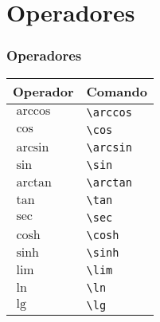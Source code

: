 \documentclass[brazilian]{beamer}
\begin{document}
\section{Operadores}
\begin{frame}[fragile]
    \frametitle{Operadores}

    \begin{table}
        \begin{tabular}{O{2cm}l}
            Operador & Comando \\ \hline
            \(\arccos \) & \lstinline[style=myStyleLatex]!\arccos ! \\ \hline
            \(\cos \) & \lstinline[style=myStyleLatex]!\cos ! \\ \hline
            \(\arcsin \) & \lstinline[style=myStyleLatex]!\arcsin ! \\ \hline
            \(\sin \) & \lstinline[style=myStyleLatex]!\sin ! \\ \hline
            \(\arctan \) & \lstinline[style=myStyleLatex]!\arctan ! \\ \hline
            \(\tan \) & \lstinline[style=myStyleLatex]!\tan ! \\ \hline
            \(\sec \) & \lstinline[style=myStyleLatex]!\sec ! \\ \hline
            \(\cosh \) & \lstinline[style=myStyleLatex]!\cosh ! \\ \hline
            \(\sinh \) & \lstinline[style=myStyleLatex]!\sinh ! \\ \hline
            \(\lim \) & \lstinline[style=myStyleLatex]!\lim ! \\ \hline
            \(\ln \) & \lstinline[style=myStyleLatex]!\ln ! \\ \hline
            \(\lg \) & \lstinline[style=myStyleLatex]!\lg ! \\ \hline
        \end{tabular}
    \end{table}

\end{frame}
\end{document}
